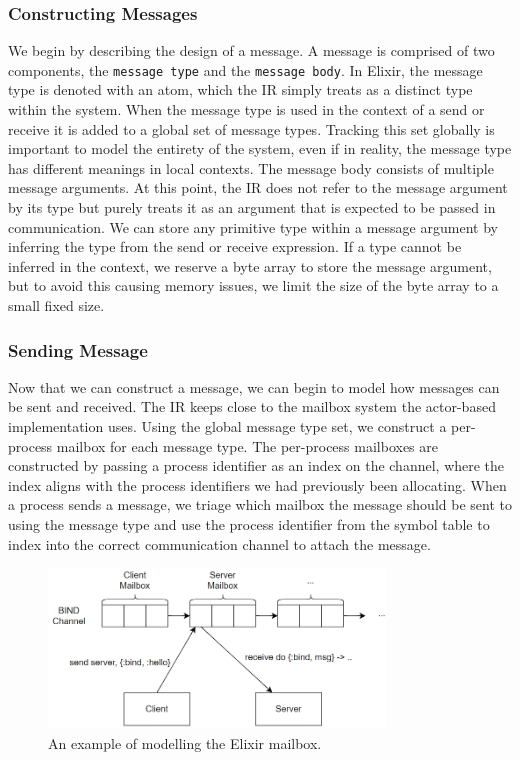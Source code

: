 \subsubsection{Constructing Messages}
We begin by describing the design of a message. A message is comprised of two components, the \texttt{message type} and the \texttt{message body}. In Elixir, the message type is denoted with an atom, which the IR simply treats as a distinct type within the system. When the message type is used in the context of a send or receive it is added to a global set of message types. Tracking this set globally is important to model the entirety of the system, even if in reality, the message type has different meanings in local contexts. The message body consists of multiple message arguments. At this point, the IR does not refer to the message argument by its type but purely treats it as an argument that is expected to be passed in communication. We can store any primitive type within a message argument by inferring the type from the send or receive expression. If a type cannot be inferred in the context, we reserve a byte array to store the message argument, but to avoid this causing memory issues, we limit the size of the byte array to a small fixed size.
\par
\subsubsection{Sending Message}
Now that we can construct a message, we can begin to model how messages can be sent and received. The IR keeps close to the mailbox system the actor-based implementation uses. Using the global message type set, we construct a per-process mailbox for each message type. The per-process mailboxes are constructed by passing a process identifier as an index on the channel, where the index aligns with the process identifiers we had previously been allocating. When a process sends a message, we triage which mailbox the message should be sent to using the message type and use the process identifier from the symbol table to index into the correct communication channel to attach the message.
\par
\begin{figure}[h]
    \centering
    \includegraphics[width=0.8\textwidth]{images/promela_messages.png}
    \caption{An example of modelling the Elixir mailbox.}
    \label{fig:promela_mailbox}
\end{figure}
\par
